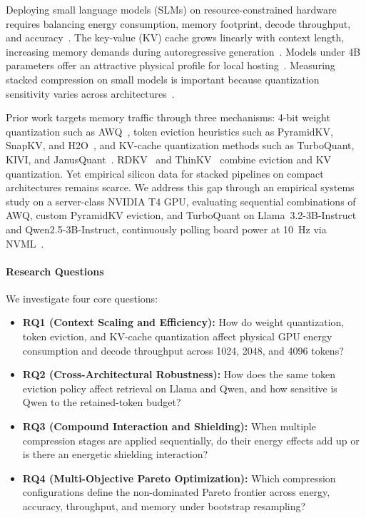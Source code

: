 \documentclass[conference,a4paper]{IEEEtran}
\begin{document}
Deploying small language models (SLMs) on resource-constrained hardware requires balancing energy consumption, memory footprint, decode throughput, and accuracy~\cite{strubell_energy_2019,patterson_carbon_2021,schwartz2020green}. The key-value (KV) cache grows linearly with context length, increasing memory demands during autoregressive generation~\cite{li2024survey,dao_flashattention_2022}. Models under 4B parameters offer an attractive physical profile for local hosting~\cite{husom_sustainable_2025}. Measuring stacked compression on small models is important because quantization sensitivity varies across architectures~\cite{wang_slmquant_2025}.

Prior work targets memory traffic through three mechanisms: 4-bit weight quantization such as AWQ~\cite{lin_awq_2025}, token eviction heuristics such as PyramidKV, SnapKV, and H2O~\cite{cai_pyramidkv_2025,li_snapkv_2024,zhang_h2o_2023}, and KV-cache quantization methods such as TurboQuant, KIVI, and JanusQuant~\cite{zandieh2026turboquant,liu_kivi_2023,sun2026janusquant}. RDKV~\cite{zhang_rdkv_2026} and ThinKV~\cite{ramachandran_thinkv_2026} combine eviction and KV quantization. Yet empirical silicon data for stacked pipelines on compact architectures remains scarce. We address this gap through an empirical systems study on a server-class NVIDIA T4 GPU, evaluating sequential combinations of AWQ, custom PyramidKV eviction, and TurboQuant on Llama~3.2-3B-Instruct and Qwen2.5-3B-Instruct, continuously polling board power at 10~Hz via NVML~\cite{argerich_watt_2026,nvidia2024nvml}.

\paragraph{Research Questions}
We investigate four core questions:
\begin{itemize}
\item \textbf{RQ1 (Context Scaling and Efficiency):} How do weight quantization, token eviction, and KV-cache quantization affect physical GPU energy consumption and decode throughput across 1024, 2048, and 4096 tokens?
\item \textbf{RQ2 (Cross-Architectural Robustness):} How does the same token eviction policy affect retrieval on Llama and Qwen, and how sensitive is Qwen to the retained-token budget?
\item \textbf{RQ3 (Compound Interaction and Shielding):} When multiple compression stages are applied sequentially, do their energy effects add up or is there an energetic shielding interaction?
\item \textbf{RQ4 (Multi-Objective Pareto Optimization):} Which compression configurations define the non-dominated Pareto frontier across energy, accuracy, throughput, and memory under bootstrap resampling?
\end{itemize}
\end{document}
